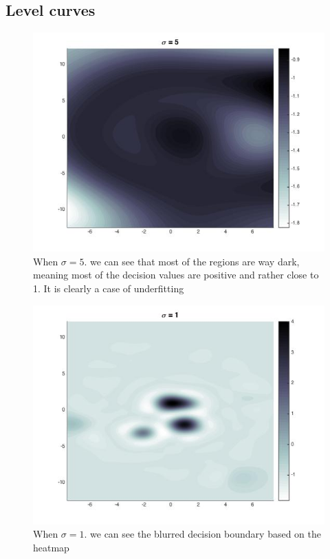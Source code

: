 \documentclass[twoside]{article}
\theoremstyle{definition}
\theoremstyle{definition}
\theoremstyle{remark}
\begin{document}
\subsection{Level curves}
\begin{figure}[H]
\centering
\includegraphics[width=120mm]{sigma_5.jpg}
\caption{ When $\sigma = 5$. we can see that most of the regions are way dark, meaning most of the decision values are positive and rather close to 1. It is clearly a case of underfitting \label{problem2Pic2}}
\end{figure}

\begin{figure}[H]
\centering
\includegraphics[width=120mm]{sigma_1.jpg}
\caption{ When $\sigma = 1$. we can see the blurred decision boundary based on the heatmap\label{problem2Pic3}}
\end{figure}
\end{document}
